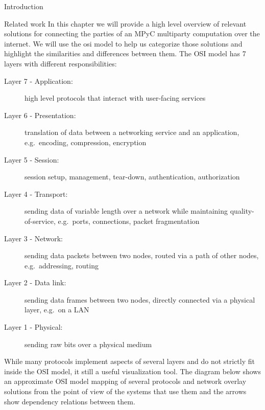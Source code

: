 \begin{frame}
\tableofcontents

\printnoidxglossary[type=\acronymtype,title=List of Abbreviations]
\listoffigures

\mainmatter
\end{frame}

\begin{frame}{Introduction}
\protect\hypertarget{introduction}{}
\end{frame}

\begin{frame}[fragile]{Related work}
\protect\hypertarget{related-work}{}
In this chapter we will provide a high level overview of relevant
solutions for connecting the parties of an MPyC multiparty computation
over the internet. We will use the \gls{osi} model to help us categorize
those solutions and highlight the similarities and differences between
them. The OSI model has 7 layers with different responsibilities:

\begin{description}
\item[Layer 7 - Application:]
high level protocols that interact with user-facing services
\item[Layer 6 - Presentation:]
translation of data between a networking service and an application,
e.g.~encoding, compression, encryption
\item[Layer 5 - Session:]
session setup, management, tear-down, authentication, authorization
\item[Layer 4 - Transport:]
sending data of variable length over a network while maintaining
quality-of-service, e.g.~ports, connections, packet fragmentation
\item[Layer 3 - Network:]
sending data packets between two nodes, routed via a path of other
nodes, e.g.~addressing, routing
\item[Layer 2 - Data link:]
sending data frames between two nodes, directly connected via a physical
layer, e.g.~on a LAN
\item[Layer 1 - Physical:]
sending raw bits over a physical medium
\end{description}

While many protocols implement aspects of several layers and do not
strictly fit inside the OSI model, it still a useful visualization tool.
The diagram below shows an approximate OSI model mapping of several
protocols and network overlay solutions from the point of view of the
systems that use them and the arrows show dependency relations between
them.


\end{frame}
